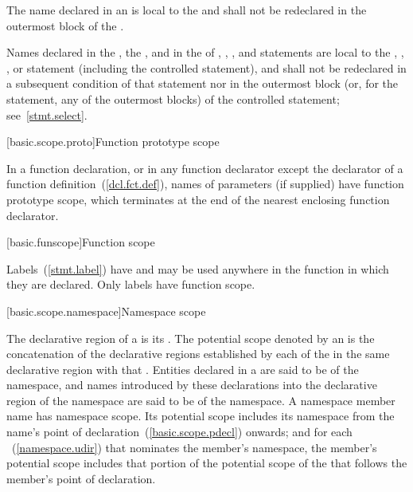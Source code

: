 \pnum
{}%
The name declared in an 
is local to the
 and shall not be redeclared in the outermost block of the
.

\pnum
Names declared in the , the , and in the
 of , , , and
 statements are local to the , ,
, or  statement (including the controlled
statement), and shall not be redeclared in a subsequent condition of
that statement nor in the outermost block (or, for the 
statement, any of the outermost blocks) of the controlled statement;
see~\ref{stmt.select}.

[basic.scope.proto]{Function prototype scope}

\pnum
{}%
%
In a function declaration, or in any function declarator except the
declarator of a function definition~(\ref{dcl.fct.def}), names of
parameters (if supplied) have function prototype scope, which terminates
at the end of the nearest enclosing function declarator.

[basic.funscope]{Function scope}

\pnum
{}%
%
Labels~(\ref{stmt.label}) have  and
may be used anywhere in the function in which they are declared. Only
labels have function scope.

[basic.scope.namespace]{Namespace scope}

\pnum
{}%
The declarative region of a  is its
. The potential scope denoted by an
 is the concatenation of the
declarative regions established by each of the
 in the same declarative region with
that . Entities declared in a
 are said to be  of the
namespace, and names introduced by these declarations into the
declarative region of the namespace are said to be  of the namespace. A namespace member name has namespace scope.
Its potential scope includes its namespace from the name's point of
declaration~(\ref{basic.scope.pdecl}) onwards; and for each
~(\ref{namespace.udir}) that nominates the
member's namespace, the member's potential scope includes that portion
of the potential scope of the  that follows
the member's point of declaration. \enterexample

